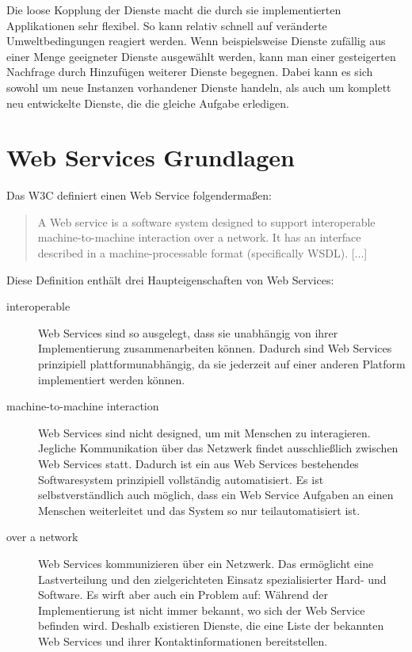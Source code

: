 \documentclass[runningheads]{llncs}
\newcommand{\germanquote}[1]{\glqq{}#1\grqq{}}
\begin{document}
    Die loose Kopplung der Dienste macht die durch sie implementierten Applikationen sehr flexibel.
    So kann relativ schnell auf veränderte Umweltbedingungen reagiert werden. Wenn beispielsweise
    Dienste zufällig aus einer Menge geeigneter Dienste ausgewählt werden, kann man einer
    gesteigerten Nachfrage durch Hinzufügen weiterer Dienste begegnen. Dabei kann es sich sowohl um
    neue Instanzen vorhandener Dienste handeln, als auch um komplett neu entwickelte Dienste, die
    die gleiche Aufgabe erledigen.


  \label{ws}
  \section{Web Services Grundlagen}
  \nocite{wk_ws}
    Das W3C definiert einen \germanquote{Web Service} folgendermaßen:
    \begin{quote}
      A Web service is a software system designed to support interoperable machine-to-machine interaction
      over a network. It has an interface described in a machine-processable format (specifically
      WSDL). [...]\cite{w3c_wsgloss_ws}
    \end{quote}

    Diese Definition enthält drei Haupteigenschaften von Web Services:
    \begin{description}
      \item[interoperable]
        Web Services sind so ausgelegt, dass sie unabhängig von ihrer Implementierung
        zusammenarbeiten können. Dadurch sind Web Services prinzipiell plattformunabhängig, da sie
        jederzeit auf einer anderen Platform implementiert werden können.
      \item[machine-to-machine interaction]
        Web Services sind nicht designed, um mit Menschen zu interagieren. Jegliche Kommunikation
        über das Netzwerk findet ausschließlich zwischen Web Services statt. Dadurch ist ein aus
        Web Services bestehendes Softwaresystem prinzipiell vollständig automatisiert. Es ist
        selbstverständlich auch möglich, dass ein Web Service Aufgaben an einen Menschen
        weiterleitet und das System so nur teilautomatisiert ist.
      \item[over a network]
        Web Services kommunizieren über ein Netzwerk. Das ermöglicht eine Lastverteilung und den
        zielgerichteten Einsatz spezialisierter Hard- und Software. Es wirft aber auch ein Problem
        auf: Während der Implementierung ist nicht immer bekannt, wo sich der Web Service befinden
        wird. Deshalb existieren Dienste, die eine Liste der bekannten Web Services und ihrer
        Kontaktinformationen bereitstellen.
    \end{description}
\end{document}
